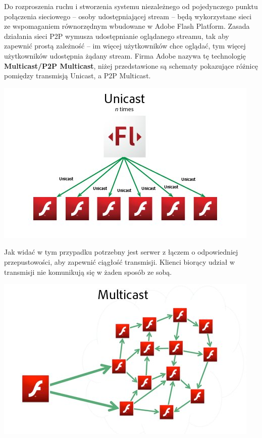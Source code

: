 Do rozproszenia ruchu i stworzenia systemu niezależnego od pojedynczego punktu połączenia sieciowego -- osoby udostępniającej stream -- będą wykorzystane sieci ze wspomaganiem równorzędnym wbudowane w Adobe Flash Platform. Zasada działania sieci P2P wymusza udostępnianie oglądanego streamu, tak aby zapewnić prostą zależność -- im więcej użytkowników chce oglądać, tym więcej użytkowników udostępnia żądany stream. Firma Adobe nazywa tę technologię \textbf{Multicast/P2P Multicast}, niżej przedstawione są schematy pokazujące różnicę pomiędzy transmisją Unicast, a P2P Multicast.

    \begin{center}
        \includegraphics[width=\textwidth]{img/adobe-p2p-unicast.jpg}
    \end{center}

    Jak widać w tym przypadku potrzebny jest serwer z łączem o odpowiedniej przepustowości, aby zapewnić ciągłość transmisji. Klienci biorący udział w transmisji nie komunikują się w żaden sposób ze sobą.

    \begin{center}
        \includegraphics[width=\textwidth]{img/adobe-p2p-multicast.jpg}
    \end{center}


